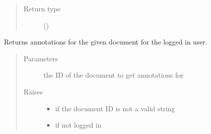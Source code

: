 \documentclass[letterpaper,10pt,english]{sphinxmanual}
\begin{document}
\begin{fulllineitems}
\begin{fulllineitems}
\begin{quote}
\begin{description}
\item[{Return type}] \leavevmode
\sphinxAtStartPar
{}()

\end{description}\end{quote}

\end{fulllineitems}


\begin{fulllineitems}
\label{\detokenize{autoapi/pine/client/client/index:pine.client.client.PineClient.get_my_document_annotations}}
\sphinxAtStartPar
Returns annotations for the given document for the logged in user.
\begin{quote}\begin{description}
\item[{Parameters}] \leavevmode
\sphinxAtStartPar
{} \textendash{} the ID of the document to get annotations for

\item[{Raises}] \leavevmode\begin{itemize}
\item {} 
\sphinxAtStartPar
{\hyperref[\detokenize{autoapi/pine/client/exceptions/index:pine.client.exceptions.PineClientValueException}]{}} \textendash{} if the document ID is not a valid string

\item {} 
\sphinxAtStartPar
{\hyperref[\detokenize{autoapi/pine/client/exceptions/index:pine.client.exceptions.PineClientAuthException}]{}} \textendash{} if not logged in


\end{itemize}
\end{description}
\end{quote}
\end{fulllineitems}
\end{fulllineitems}
\end{document}
